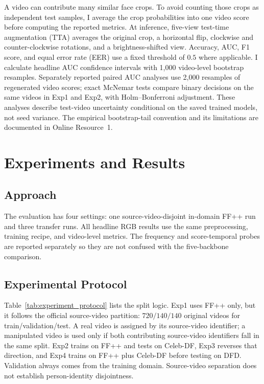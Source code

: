 \documentclass[pdflatex,sn-mathphys-num,iicol]{sn-jnl}
\begin{document}
A video can contribute many similar face crops. To avoid counting those crops as independent test samples, I average the crop probabilities into one video score before computing the reported metrics. At inference, five-view test-time augmentation (TTA) averages the original crop, a horizontal flip, clockwise and counter-clockwise rotations, and a brightness-shifted view. Accuracy, AUC, F1 score, and equal error rate (EER) use a fixed threshold of $0.5$ where applicable. I calculate headline AUC confidence intervals with 1,000 video-level bootstrap resamples. Separately reported paired AUC analyses use 2,000 resamples of regenerated video scores; exact McNemar tests compare binary decisions on the same videos in Exp1 and Exp2, with Holm--Bonferroni adjustment. These analyses describe test-video uncertainty conditional on the saved trained models, not seed variance. The empirical bootstrap-tail convention and its limitations are documented in Online Resource~1.

\section{Experiments and Results}
\label{sec:experimental}
\subsection{Approach}
The evaluation has four settings: one source-video-disjoint in-domain FF++ run and three transfer runs. All headline RGB results use the same preprocessing, training recipe, and video-level metrics. The frequency and score-temporal probes are reported separately so they are not confused with the five-backbone comparison.

\subsection{Experimental Protocol}
\label{sec:protocol}
Table~\ref{tab:experiment_protocol} lists the split logic. Exp1 uses FF++ only, but it follows the official source-video partition: $720/140/140$ original videos for train/validation/test. A real video is assigned by its source-video identifier; a manipulated video is used only if both contributing source-video identifiers fall in the same split. Exp2 trains on FF++ and tests on Celeb-DF, Exp3 reverses that direction, and Exp4 trains on FF++ plus Celeb-DF before testing on DFD. Validation always comes from the training domain. Source-video separation does not establish person-identity disjointness.
\end{document}
